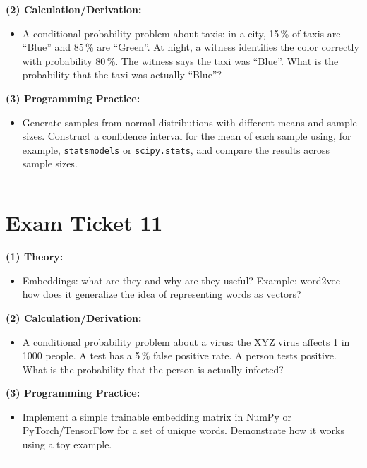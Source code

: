 \documentclass[a4paper,12pt]{article}
\begin{document}
\textbf{(2) Calculation/Derivation:}
\begin{itemize}
  \item A conditional probability problem about taxis: in a city, 15\,\% of taxis are ``Blue'' and 85\,\% are ``Green''. At night, a witness identifies the color correctly with probability 80\,\%. The witness says the taxi was ``Blue''. What is the probability that the taxi was actually ``Blue''?
\end{itemize}

\textbf{(3) Programming Practice:}
\begin{itemize}
  \item Generate samples from normal distributions with different means and sample sizes. Construct a confidence interval for the mean of each sample using, for example, \texttt{statsmodels} or \texttt{scipy.stats}, and compare the results across sample sizes.
\end{itemize}

\noindent\rule{\textwidth}{0.4pt}
\newpage

\section*{Exam Ticket 11}
\textbf{(1) Theory:}
\begin{itemize}
  \item Embeddings: what are they and why are they useful? Example: word2vec --- how does it generalize the idea of representing words as vectors?
\end{itemize}

\textbf{(2) Calculation/Derivation:}
\begin{itemize}
  \item A conditional probability problem about a virus: the XYZ virus affects 1 in 1000 people. A test has a 5\,\% false positive rate. A person tests positive. What is the probability that the person is actually infected?
\end{itemize}

\textbf{(3) Programming Practice:}
\begin{itemize}
  \item Implement a simple trainable embedding matrix in NumPy or PyTorch/TensorFlow for a set of unique words. Demonstrate how it works using a toy example.
\end{itemize}

\noindent\rule{\textwidth}{0.4pt}
\newpage
\end{document}
